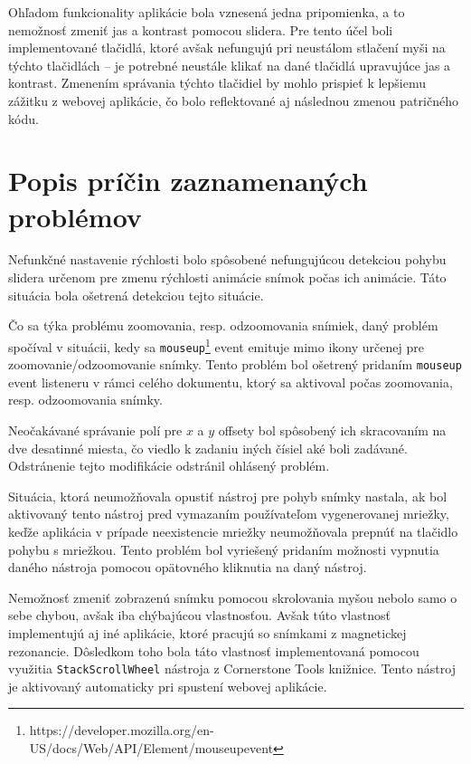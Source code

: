 Ohľadom funkcionality aplikácie bola vznesená jedna pripomienka, a to nemožnosť zmeniť jas a kontrast pomocou slidera. Pre tento účel boli implementované tlačidlá, ktoré avšak nefungujú pri neustálom stlačení myši na týchto tlačidlách -- je potrebné neustále klikať na dané tlačidlá upravujúce jas a kontrast. Zmenením správania týchto tlačidiel by mohlo prispieť k lepšiemu zážitku z webovej aplikácie, čo bolo reflektované aj následnou zmenou patričného kódu. 

\section {Popis príčin zaznamenaných problémov}
Nefunkčné nastavenie rýchlosti bolo spôsobené nefungujúcou detekciou pohybu slidera určenom pre zmenu rýchlosti animácie snímok počas ich animácie. Táto situácia bola ošetrená detekciou tejto situácie.

Čo sa týka problému zoomovania, resp. odzoomovania snímiek, daný problém spočíval v situácii, kedy sa \texttt{mouseup}\footnote{https://developer.mozilla.org/en-US/docs/Web/API/Element/mouseup\textunderscore event} event emituje mimo ikony určenej pre zoomovanie/odzoomovanie snímky. Tento problém bol ošetrený pridaním \texttt{mouseup} event listeneru v rámci celého dokumentu, ktorý sa aktivoval počas zoomovania, resp. odzoomovania snímky.

\clearpage

Neočakávané správanie polí pre $x$ a $y$ offsety bol spôsobený ich skracovaním na dve desatinné miesta, čo viedlo k zadaniu iných čísiel aké boli zadávané. Odstránenie tejto modifikácie odstránil ohlásený problém.

Situácia, ktorá neumožňovala opustiť nástroj pre pohyb snímky nastala, ak bol aktivovaný tento nástroj pred vymazaním používateľom vygenerovanej mriežky, keďže aplikácia v prípade neexistencie mriežky neumožňovala prepnúť na tlačidlo pohybu s mriežkou. Tento problém bol vyriešený pridaním možnosti vypnutia daného nástroja pomocou opätovného kliknutia na daný nástroj.

Nemožnosť zmeniť zobrazenú snímku pomocou skrolovania myšou nebolo samo o sebe chybou, avšak iba chýbajúcou vlastnosťou. Avšak túto vlastnosť implementujú aj iné aplikácie, ktoré pracujú so snímkami z magnetickej rezonancie. Dôsledkom toho bola táto vlastnosť implementovaná pomocou využitia \texttt{StackScrollWheel} nástroja z Cornerstone Tools knižnice. Tento nástroj je aktivovaný automaticky pri spustení webovej aplikácie.

